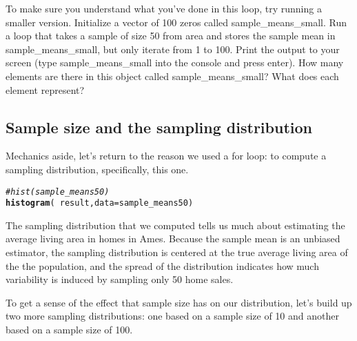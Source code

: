 \documentclass{article}\usepackage[]{graphicx}\usepackage[]{color}
\makeatletter
\newcommand{\hlcom}[1]{\textcolor[rgb]{0.678,0.584,0.686}{\textit{#1}}}%
\newcommand{\hlopt}[1]{\textcolor[rgb]{0,0,0}{#1}}%
\newcommand{\hlstd}[1]{\textcolor[rgb]{0.345,0.345,0.345}{#1}}%
\newcommand{\hlkwc}[1]{\textcolor[rgb]{0.333,0.667,0.333}{#1}}%
\newcommand{\hlkwd}[1]{\textcolor[rgb]{0.737,0.353,0.396}{\textbf{#1}}}%
\newenvironment{kframe}{%
 \def\at@end@of@kframe{}%
 \ifinner\ifhmode%
  \def\at@end@of@kframe{\end{minipage}}%
  \begin{minipage}{\columnwidth}%
 \fi\fi%
 \def\FrameCommand##1{\hskip\@totalleftmargin \hskip-\fboxsep
 \colorbox{shadecolor}{##1}\hskip-\fboxsep
     \hskip-\linewidth \hskip-\@totalleftmargin \hskip\columnwidth}%
 \MakeFramed {\advance\hsize-\width
   \@totalleftmargin\z@ \linewidth\hsize
   \@setminipage}}%
 {\par\unskip\endMakeFramed%
 \at@end@of@kframe}
\newenvironment{knitrout}{}{} %
\makeatother
\begin{document}
\begin{exercise}
To make sure you understand what you've done in this loop, try running a smaller version.  Initialize a vector of 100 zeros called \hlstd{sample\_means\_small}.  Run a loop that takes a sample of size 50 from \hlstd{area} and stores the sample mean in \hlstd{sample\_means\_small}, but only iterate from 1 to 100.  Print the output to your screen (type \hlstd{sample\_means\_small} into the console and press enter).  How many elements are there in this object called \hlstd{sample\_means\_small}? What does each element represent?
\end{exercise}

\subsection*{Sample size and the sampling distribution}
Mechanics aside, let's return to the reason we used a for loop: to compute a sampling distribution, specifically, this one.

\begin{knitrout}
\color{fgcolor}\begin{kframe}
\begin{alltt}
\hlcom{# hist(sample_means50)}
\hlkwd{histogram}\hlstd{(}\hlopt{~}\hlstd{result,} \hlkwc{data} \hlstd{= sample_means50)}
\end{alltt}
\end{kframe}
\end{knitrout}


The sampling distribution that we computed tells us much about estimating the average living area in homes in Ames.  Because the sample mean is an unbiased estimator, the sampling distribution is centered at the true average living area of the the population, and the spread of the distribution indicates how much variability is induced by sampling only 50 home sales.

To get a sense of the effect that sample size has on our distribution, let's build up two more sampling distributions: one based on a sample size of 10 and another based on a sample size of 100.
\end{document}
